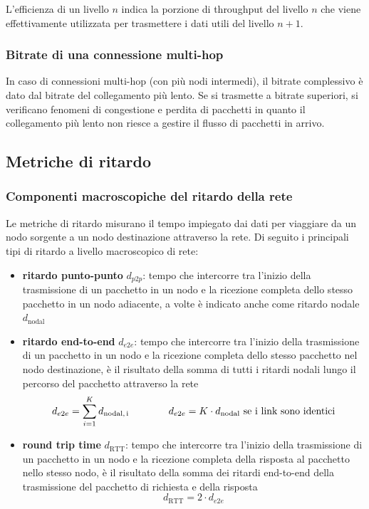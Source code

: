 \noindent
L'efficienza di un livello \(n\) indica la porzione di throughput del livello \(n\) che viene effettivamente utilizzata
per trasmettere i dati utili del livello \(n+1\).

\subsubsection*{Bitrate di una connessione multi-hop}
In caso di connessioni multi-hop (con più nodi intermedi), il bitrate complessivo è dato dal bitrate del collegamento
più lento. Se si trasmette a bitrate superiori, si verificano fenomeni di congestione e perdita di pacchetti in quanto
il collegamento più lento non riesce a gestire il flusso di pacchetti in arrivo.

\subsection{Metriche di ritardo}
\subsubsection*{Componenti macroscopiche del ritardo della rete}
Le metriche di ritardo misurano il tempo impiegato dai dati per viaggiare da un nodo sorgente a un nodo destinazione
attraverso la rete. Di seguito i principali tipi di ritardo a livello macroscopico di rete:
\begin{itemize}
	\item \textbf{ritardo punto-punto} \(d_{p2p}\): tempo che intercorre tra l'inizio della trasmissione di un pacchetto
	in un nodo e la ricezione completa dello stesso pacchetto in un nodo adiacente, a volte è indicato anche come ritardo
	nodale \(d_\text{nodal}\)
	\item \textbf{ritardo end-to-end} \(d_{e2e}\): tempo che intercorre tra l'inizio della trasmissione di un pacchetto
	in un nodo e la ricezione completa dello stesso pacchetto nel nodo destinazione, è il risultato della somma di tutti
	i ritardi nodali lungo il percorso del pacchetto attraverso la rete
	\[d_{e2e} = \sum_{i = 1}^K d_\text{nodal,\,i} \qquad\qquad d_{e2e} = K \cdot d_\text{nodal} \text{ se i link sono identici}\]
	\item \textbf{round trip time} \(d_\text{RTT}\): tempo che intercorre tra l'inizio della trasmissione di un pacchetto in
	un nodo e la ricezione completa della risposta al pacchetto nello stesso nodo, è il risultato della somma dei ritardi
	end-to-end della trasmissione del pacchetto di richiesta e della risposta
	\[d_\text{RTT} = 2 \cdot d_{e2e}\]
\end{itemize}

